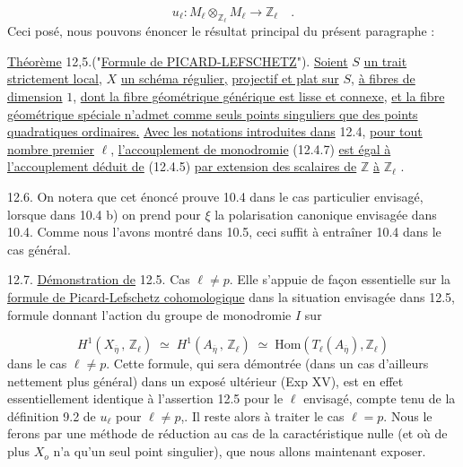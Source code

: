 \begin{equation}\tag{12.4.7}
u_{\ell} : M_{\ell} \otimes_{\mathbb{Z}_{\ell}} M_{\ell} \longrightarrow \mathbb{Z}_{\ell} \quad .
\end{equation}
Ceci posé, nous pouvons énoncer le résultat principal du présent paragraphe :

\underline{Théorème} 12,5.("\underline{Formule de PICARD-LEFSCHETZ}"). \underline{Soient} $S$ \underline{un trait strictement local,} $X$ \underline{un schéma régulier,} \underline{projectif et plat sur} $S$, \underline{à fibres de dimension} $1$, \underline{dont la fibre géométrique générique est lisse et connexe}, \underline{et la fibre géométrique spéciale n'admet comme seuls points singuliers que des points quadratiques ordinaires.} \underline{Avec les notations introduites dans} 12.4, \underline{pour tout nombre premier} $\ell$, \underline{l'accouplement de monodromie} (12.4.7) \underline{est égal à l'accouplement déduit de} (12.4.5) \underline{par extension des scalaires de} $\mathbb{Z}$ \underline{à} $\mathbb{Z}_{\ell}$ .



12.6.  On notera que cet énoncé prouve 10.4 dans le cas particulier envisagé, lorsque dans 10.4 b) on prend pour $\xi$ la polarisation canonique envisagée dans 10.4. Comme nous l'avons montré dans 10.5, ceci suffit à entraîner 10.4 dans le cas général.

12.7.  \underline{Démonstration de} 12.5. Cas $\ell \neq p$. Elle s'appuie de façon essentielle sur la \underline{formule de Picard-Lefschetz cohomologique} dans la situation envisagée dans 12.5, formule donnant l'action du groupe de monodromie $I$ sur

\begin{equation}\tag{12.7.1}
H^1(X_{\overline{\eta}} \, , \, \mathbb{Z}_\ell) \;\simeq\; H^1(A_{\overline{\eta}} \, , \, \mathbb{Z}_\ell) \;\simeq\; \mathrm{Hom}(T_\ell(A_{\overline{\eta}}), \mathbb{Z}_\ell)
\end{equation}
dans le cas $\ell \neq p$. Cette formule, qui sera démontrée (dans un cas d'ailleurs nettement plus général) dans un exposé ultérieur (Exp XV), est en effet essentiellement identique à l'assertion 12.5 pour le $\ell$ envisagé, compte tenu de la définition 9.2 de $u_\ell$ pour $\ell \neq p$,. Il reste alors à traiter le cas $\ell = p$. Nous le ferons par une méthode de réduction au cas de la caractéristique nulle (et où de plus $X_o$ n'a qu'un seul point singulier), que nous allons maintenant exposer.


